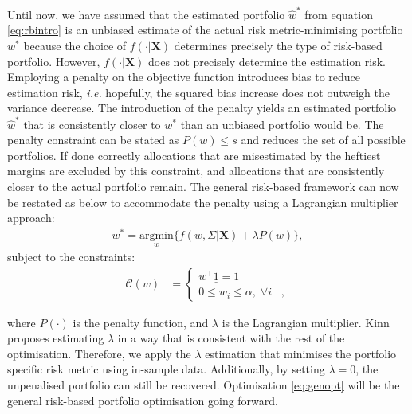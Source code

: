 \documentclass[
]{article}
\begin{document}
Until now, we have assumed that the estimated portfolio \(\hat{w}^*\) from equation \eqref{eq:rbintro}
is an unbiased estimate of the actual risk metric-minimising portfolio \(w^*\) because the choice of
\(f(\cdot | \textbf{X})\) determines precisely the type of risk-based portfolio. However,
\(f(\cdot|\textbf{X})\) does not precisely determine the estimation risk. Employing a penalty on the
objective function introduces bias to reduce estimation risk, \emph{i.e.} hopefully, the squared
bias increase does not outweigh the variance decrease. The introduction of the penalty yields an
estimated portfolio \(\hat{w}^*\) that is consistently closer to \(w^*\) than an unbiased portfolio would
be. The penalty constraint can be stated as \(P(w) \leq s\) and reduces the set of all possible
portfolios. If done correctly allocations that are misestimated by the heftiest margins are excluded
by this constraint, and allocations that are consistently closer to the actual portfolio remain. The
general risk-based framework can now be restated as below to accommodate the penalty using a
Lagrangian multiplier approach:
\begin{align}
w^* = \underset{w}{\text{argmin}} \Big \{ f(w, \Sigma| \textbf{X}) + \lambda P(w) \Big \}, \label{eq:genopt}
\end{align}
subject to the constraints:
\begin{align*}
\mathcal{C}(w) &= 
\begin{cases}
w^\intercal \underline{1} = 1 \;\; \\
0 \leq w_i \leq \alpha, \; \forall i \;\;\; ,
\end{cases}
\end{align*}

where \(P(\cdot)\) is the penalty function, and \(\lambda\) is the Lagrangian multiplier. Kinn proposes
estimating \(\lambda\) in a way that is consistent with the rest of the optimisation. Therefore, we
apply the \(\lambda\) estimation that minimises the portfolio specific risk metric using in-sample
data. Additionally, by setting \(\lambda = 0\), the unpenalised portfolio can still be recovered.
Optimisation \eqref{eq:genopt} will be the general risk-based portfolio optimisation going forward.
\end{document}
